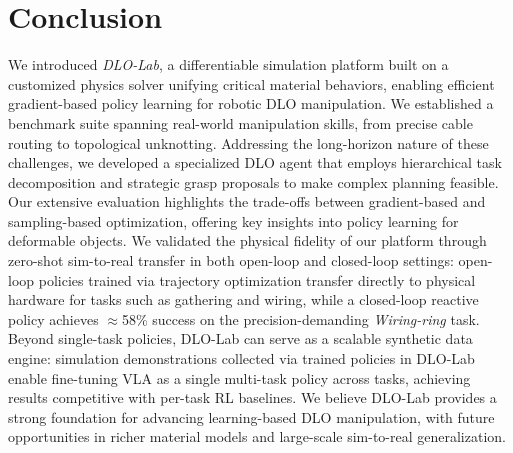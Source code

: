 \vspace{2mm}
\section{Conclusion}
We introduced \emph{DLO-Lab}, a differentiable simulation platform built on a customized physics solver unifying critical material behaviors, enabling efficient gradient-based policy learning for robotic DLO manipulation. We established a benchmark suite spanning real-world manipulation skills, from precise cable routing to topological unknotting. Addressing the long-horizon nature of these challenges, we developed a specialized DLO agent that employs hierarchical task decomposition and strategic grasp proposals to make complex planning feasible. Our extensive evaluation highlights the trade-offs between gradient-based and sampling-based optimization, offering key insights into policy learning for deformable objects. We validated the physical fidelity of our platform through zero-shot sim-to-real transfer in both open-loop and closed-loop settings: open-loop policies trained via trajectory optimization transfer directly to physical hardware for tasks such as gathering and wiring, while a closed-loop reactive policy achieves $\approx$58\% success on the precision-demanding \textit{Wiring-ring} task. Beyond single-task policies, DLO-Lab can serve as a scalable synthetic data engine: simulation demonstrations collected via trained policies in DLO-Lab enable fine-tuning VLA as a single multi-task policy across tasks, achieving results competitive with per-task RL baselines. We believe DLO-Lab provides a strong foundation for advancing learning-based DLO manipulation, with future opportunities in richer material models and large-scale sim-to-real generalization.